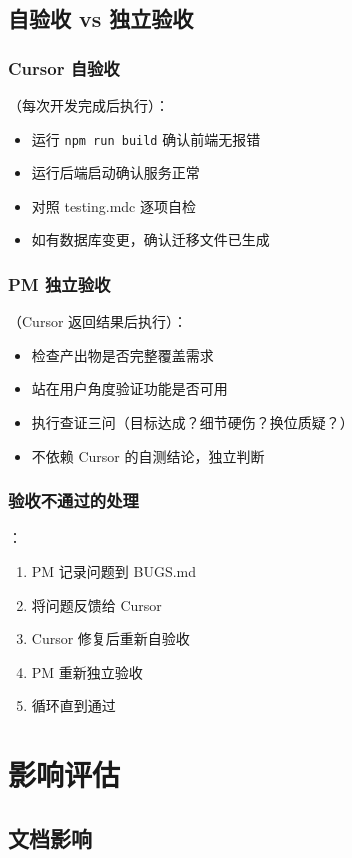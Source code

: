 \documentclass[11pt,a4paper]{article}
\begin{document}
\subsection{自验收 vs 独立验收}

\subsubsection{Cursor 自验收}（每次开发完成后执行）：
\begin{itemize}
  \item 运行 \texttt{npm run build} 确认前端无报错
  \item 运行后端启动确认服务正常
  \item 对照 testing.mdc 逐项自检
  \item 如有数据库变更，确认迁移文件已生成
\end{itemize}

\subsubsection{PM 独立验收}（Cursor 返回结果后执行）：
\begin{itemize}
  \item 检查产出物是否完整覆盖需求
  \item 站在用户角度验证功能是否可用
  \item 执行查证三问（目标达成？细节硬伤？换位质疑？）
  \item 不依赖 Cursor 的自测结论，独立判断
\end{itemize}

\subsubsection{验收不通过的处理}：
\begin{enumerate}
  \item PM 记录问题到 BUGS.md
  \item 将问题反馈给 Cursor
  \item Cursor 修复后重新自验收
  \item PM 重新独立验收
  \item 循环直到通过
\end{enumerate}

\section{影响评估}

\subsection{文档影响}
\end{document}
